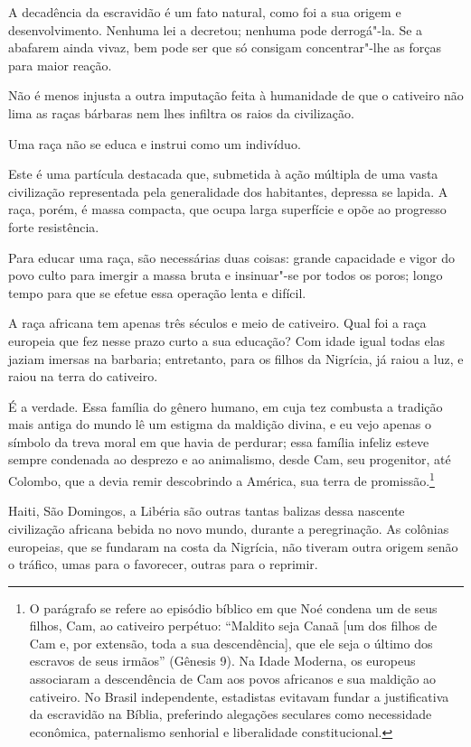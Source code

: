 A decadência da escravidão é um fato natural, como foi a sua origem e
desenvolvimento. Nenhuma lei a decretou; nenhuma pode derrogá"-la. Se
a abafarem ainda vivaz, bem pode ser que só consigam concentrar"-lhe
as forças para maior reação. 

Não é menos injusta a outra imputação feita à humanidade de que o
cativeiro não lima as raças bárbaras nem lhes infiltra os raios da civilização. 

Uma raça não se educa e instrui como um indivíduo. 

Este é uma partícula destacada que, submetida à ação múltipla de uma
vasta civilização representada pela generalidade dos habitantes,
depressa se lapida. A raça, porém, é massa compacta, que ocupa larga
superfície e opõe ao progresso forte resistência.

Para educar uma raça, são necessárias duas coisas: grande capacidade e
vigor do povo culto para imergir a massa bruta e insinuar"-se por
todos os poros; longo tempo para que se efetue essa operação lenta e difícil.

A raça africana tem apenas três séculos e meio de cativeiro. Qual foi a \label{tresseculos}
raça europeia que fez nesse prazo curto a sua educação? Com idade igual
todas elas jaziam imersas na barbaria; entretanto, para os filhos da
Nigrícia, já raiou a luz, e raiou na terra do cativeiro.

É a verdade. Essa família do gênero humano, em cuja tez combusta a
tradição mais antiga do mundo lê um estigma da maldição divina, e eu
vejo apenas o símbolo da treva moral em que havia de perdurar; essa
família infeliz esteve sempre condenada ao desprezo e ao animalismo,
desde Cam, seu progenitor, até Colombo, que a devia remir descobrindo a
América, sua terra de promissão.\footnote{ O parágrafo se refere ao episódio 
bíblico em que Noé condena um de seus filhos, Cam, ao cativeiro perpétuo: 
``Maldito seja Canaã [um dos filhos de Cam e, por extensão, toda a sua descendência], 
que ele seja o último dos escravos de seus irmãos'' (Gênesis 9). Na Idade Moderna, 
os europeus associaram a descendência de Cam aos povos africanos e sua maldição ao 
cativeiro. No Brasil independente, estadistas evitavam fundar a justificativa da 
escravidão na Bíblia, preferindo alegações seculares como necessidade econômica, paternalismo
senhorial e liberalidade constitucional.}

Haiti, São Domingos, a Libéria são outras tantas balizas dessa nascente
civilização africana bebida no novo mundo, durante a peregrinação. As
colônias europeias, que se fundaram na costa da Nigrícia, não tiveram
outra origem senão o tráfico, umas para o favorecer, outras para o reprimir.

